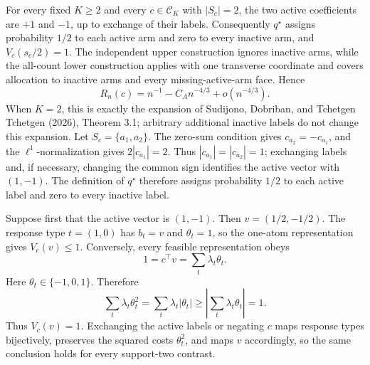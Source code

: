 For every fixed \(K\ge2\) and every \(c\in\mathcal C_K\) with \(|S_c|=2\), the two active coefficients are \(+1\) and \(-1\), up to exchange of their labels.  Consequently \(q^\star\) assigns probability \(1/2\) to each active arm and zero to every inactive arm, and \(V_c(s_c/2)=1\).  The independent upper construction ignores inactive arms, while the all-count lower construction applies with one transverse coordinate and covers allocation to inactive arms and every missing-active-arm face.  Hence
\[
R_n(c)=n^{-1}-C_An^{-4/3}+o(n^{-4/3}).
\]
When \(K=2\), this is exactly the expansion of Sudijono, Dobriban, and Tchetgen Tchetgen (2026), Theorem 3.1; arbitrary additional inactive labels do not change this expansion.
Let \(S_c=\{a_1,a_2\}\).  The zero-sum condition gives \(c_{a_2}=-c_{a_1}\), and the \(\ell^1\)-normalization gives \(2|c_{a_1}|=2\).  Thus \(|c_{a_1}|=|c_{a_2}|=1\); exchanging labels and, if necessary, changing the common sign identifies the active vector with \((1,-1)\).  The definition of \(q^\star\) therefore assigns probability \(1/2\) to each active label and zero to every inactive label.

Suppose first that the active vector is \((1,-1)\).  Then \(v=(1/2,-1/2)\).  The response type \(t=(1,0)\) has \(b_t=v\) and \(\theta_t=1\), so the one-atom representation gives \(V_c(v)\le1\).  Conversely, every feasible representation obeys
\[
1=c^\top v=\sum_t\lambda_t\theta_t.
\]
Here \(\theta_t\in\{-1,0,1\}\).  Therefore
\[
\sum_t\lambda_t\theta_t^2
=\sum_t\lambda_t|\theta_t|
\ge\left|\sum_t\lambda_t\theta_t\right|=1.
\]
Thus \(V_c(v)=1\).  Exchanging the active labels or negating \(c\) maps response types bijectively, preserves the squared costs \(\theta_t^2\), and maps \(v\) accordingly, so the same conclusion holds for every support-two contrast.


